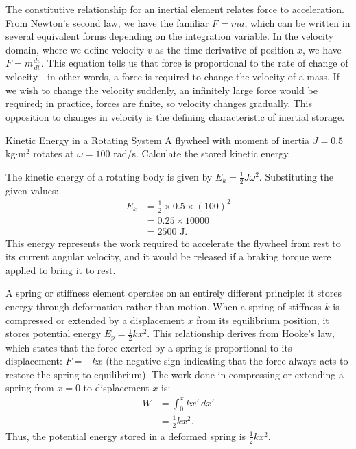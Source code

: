 The constitutive relationship for an inertial element relates force to acceleration. From Newton's second law, we have the familiar $F = ma$, which can be written in several equivalent forms depending on the integration variable. In the velocity domain, where we define velocity $v$ as the time derivative of position $x$, we have $F = m\frac{dv}{dt}$. This equation tells us that force is proportional to the rate of change of velocity—in other words, a force is required to change the velocity of a mass. If we wish to change the velocity suddenly, an infinitely large force would be required; in practice, forces are finite, so velocity changes gradually. This opposition to changes in velocity is the defining characteristic of inertial storage.

\begin{example}{Kinetic Energy in a Rotating System}
A flywheel with moment of inertia $J = 0.5$ kg$\cdot$m$^2$ rotates at $\omega = 100$ rad/s. Calculate the stored kinetic energy.

The kinetic energy of a rotating body is given by $E_k = \frac{1}{2}J\omega^2$. Substituting the given values:
\begin{align}
E_k &= \frac{1}{2} \times 0.5 \times (100)^2 \\
    &= 0.25 \times 10000 \\
    &= 2500 \text{ J}.
\end{align}
This energy represents the work required to accelerate the flywheel from rest to its current angular velocity, and it would be released if a braking torque were applied to bring it to rest.
\end{example}

A spring or stiffness element operates on an entirely different principle: it stores energy through deformation rather than motion. When a spring of stiffness $k$ is compressed or extended by a displacement $x$ from its equilibrium position, it stores potential energy $E_p = \frac{1}{2}kx^2$. This relationship derives from Hooke's law, which states that the force exerted by a spring is proportional to its displacement: $F = -kx$ (the negative sign indicating that the force always acts to restore the spring to equilibrium). The work done in compressing or extending a spring from $x = 0$ to displacement $x$ is:
\begin{align}
W &= \int_0^x kx' \, dx' \\
  &= \frac{1}{2}kx^2 .
\end{align}
Thus, the potential energy stored in a deformed spring is $\frac{1}{2}kx^2$.


